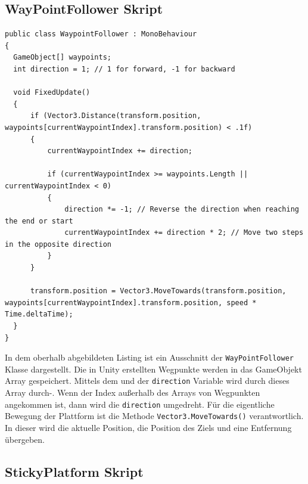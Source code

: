 \subsection{WayPointFollower Skript}

\begin{lstlisting}[language=CSharp,caption={FixedUpdate der WayPointFollower Klasse.},label=code:mainmenu]
public class WaypointFollower : MonoBehaviour
{
  GameObject[] waypoints;
  int direction = 1; // 1 for forward, -1 for backward

  void FixedUpdate()
  {
      if (Vector3.Distance(transform.position, waypoints[currentWaypointIndex].transform.position) < .1f)
      {
          currentWaypointIndex += direction;

          if (currentWaypointIndex >= waypoints.Length || currentWaypointIndex < 0)
          {
              direction *= -1; // Reverse the direction when reaching the end or start
              currentWaypointIndex += direction * 2; // Move two steps in the opposite direction
          }
      }

      transform.position = Vector3.MoveTowards(transform.position, waypoints[currentWaypointIndex].transform.position, speed * Time.deltaTime);
  }
}
\end{lstlisting}

In dem oberhalb abgebildeten Listing ist ein Ausschnitt der \verb+WayPointFollower+ Klasse dargestellt. Die in Unity erstellten Wegpunkte werden in das GameObjekt Array gespeichert. Mittels dem  und der \verb+direction+ Variable wird durch dieses Array durch-. Wenn der Index außerhalb des Arrays von Wegpunkten angekommen ist, dann wird die \verb+direction+ umgedreht. Für die eigentliche Bewegung der Plattform ist die Methode \verb+Vector3.MoveTowards()+ verantwortlich. In dieser wird die aktuelle Position, die Position des Ziels und eine Entfernung übergeben.


\pagebreak

\subsection{StickyPlatform Skript}

